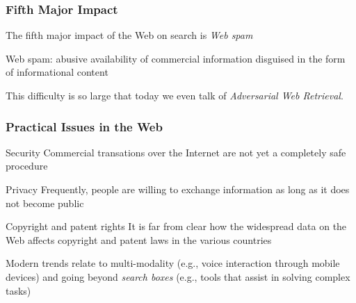 \documentclass[svgnames]{beamer}
\begin{document}
\begin{frame}
  \frametitle{Fifth Major Impact}

The fifth major impact of the Web on search is \emph{Web spam}

\begin{block}{Web spam:} 
abusive availability of commercial information disguised in the form of informational content
\end{block}

\vfill

\begin{block}{}
This difficulty is so large that today we even talk of \emph{Adversarial Web Retrieval}.
\end{block}

\end{frame}


\begin{frame}
  \frametitle{Practical Issues in the Web}

\begin{block}{Security}
Commercial transations over the Internet are not yet a completely safe procedure
\end{block}


\begin{block}{Privacy}
 Frequently, people are willing to exchange information as long as it does not become public
\end{block}


\begin{block}{ Copyright and patent rights}
It is far from clear how the widespread data on the Web affects
copyright and patent laws in the various countries
\end{block}

\begin{block}{}
Modern trends relate to multi-modality (e.g., voice interaction through mobile devices) and going beyond {\it search boxes} (e.g., tools that assist in solving complex tasks)
\end{block}

\end{frame}



\end{document}
